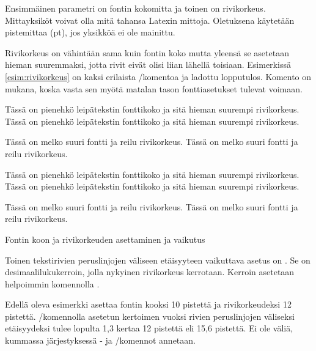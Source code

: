Ensimmäinen parametri on fontin kokomitta ja toinen on rivikorkeus.
Mitta\-yksiköt voivat olla mitä tahansa Latexin mittoja. Oletuksena
käytetään pistemittaa (pt), jos yksikköä ei ole mainittu.

Rivikorkeus on vähintään sama kuin fontin koko mutta yleensä se
asetetaan hieman suuremmaksi, jotta rivit eivät olisi liian lähellä
toisiaan. Esimerkissä \ref{esim:rivikorkeus} on kaksi erilaista
\-/komentoa ja ladottu lopputulos. Komento
 on mukana, koska vasta sen myötä matalan tason
fontti\-asetukset tulevat voimaan.

\begin{esimerkki}
\begin{koodilohko}
  \fontsize{10pt}{12pt}\selectfont Tässä on pienehkö leipätekstin
  fonttikoko ja sitä hieman suurempi rivikorkeus. Tässä on pienehkö
  leipätekstin fonttikoko ja sitä hieman suurempi rivikorkeus.

  \fontsize{16pt}{25pt}\selectfont Tässä on melko suuri fontti ja
  reilu rivikorkeus. Tässä on melko suuri fontti ja reilu
  rivikorkeus.
\end{koodilohko}
\centering
\parbox{.9\textwidth}{%
  \linespread{1}
  \fontsize{10pt}{12pt}\selectfont Tässä on pienehkö leipätekstin
  fonttikoko ja sitä hieman suurempi rivikorkeus. Tässä on
  pienehkö leipätekstin fonttikoko ja sitä hieman suurempi
  rivikorkeus.

  \fontsize{16pt}{25pt}\selectfont Tässä on melko suuri fontti ja
  reilu rivikorkeus. Tässä on melko suuri fontti ja reilu
  rivikorkeus.
}
\vspace{3ex}
\caption{Fontin koon ja rivikorkeuden asettaminen ja vaikutus}
\label{esim:rivikorkeus}
\end{esimerkki}

Toinen tekstirivien peruslinjojen väliseen etäisyyteen vaikuttava asetus
on . Se on desimaalilukukerroin, jolla
nykyinen rivikorkeus kerrotaan. Kerroin asetetaan helpoimmin komennolla
.

\begin{koodilohkosis}
  \fontsize{10pt}{12pt} \linespread{1.3} \selectfont
\end{koodilohkosis}

Edellä oleva esimerkki asettaa fontin kooksi 10 pistettä ja
rivikorkeudeksi 12 pistettä. \-/komennolla
asetetun kertoimen vuoksi rivien peruslinjojen väliseksi etäisyydeksi
tulee lopulta 1,3 kertaa 12 pistettä eli 15,6 pistettä. Ei ole väliä,
kummassa järjestyksessä - ja \-/komennot annetaan.

